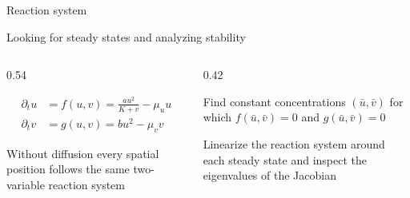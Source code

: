 

\begin{frame}{Reaction system}

  \vspace{-0.20cm}

  {\color{HydraMuted}\fontsize{8.2}{10.1}\selectfont
    Looking for steady states and analyzing stability
  \par}

  \vspace{-0.06cm}

  \begin{columns}[T,onlytextwidth]

    \begin{column}{0.54\textwidth}


      \vspace{-0.18cm}

      {\color{HydraWhite}\fontsize{10.8}{13.8}\selectfont
      \begin{align*}
        \partial_tu
        &=
        f(u,v)
        =
        \frac{au^2}{K+v}-\mu_u u
        \\
        \partial_tv
        &=
        g(u,v)
        =
        bu^2-\mu_v v
      \end{align*}
      }

      \vspace{-0.30cm}

      {\color{HydraMuted}\fontsize{7.7}{9.5}\selectfont
        Without diffusion every spatial position follows the same two-variable reaction system
      \par}

    \end{column}

    \begin{column}{0.42\textwidth}

        {Find constant concentrations $(\bar u,\bar v)$ for which $f(\bar u,\bar v)=0$ and $g(\bar u,\bar v)=0$}

      \vspace{-0.00cm}

        {Linearize the reaction system around each steady state and inspect the eigenvalues of the Jacobian}

    \end{column}

  \end{columns}

\end{frame}


